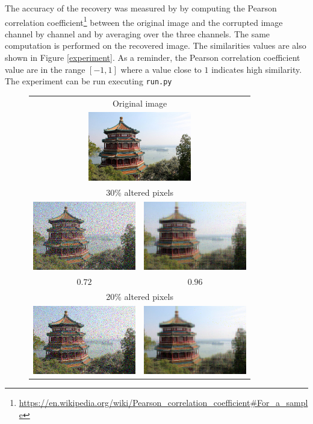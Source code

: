 \documentclass[a4paper]{article}
\begin{document}
The accuracy of the recovery was measured by by computing the Pearson correlation coefficient\footnote{\url{https://en.wikipedia.org/wiki/Pearson_correlation_coefficient#For_a_sample}} between the original image and the corrupted image channel by channel and by averaging over the three channels. The same computation is performed on the recovered image. The similarities values are also shown in Figure \ref{experiment}. As a reminder, the Pearson correlation coefficient value are in the range $[-1, 1]$ where a value close to $1$ indicates high similarity. The experiment can be run executing \texttt{run.py}

\begin{figure}
    \centering
    \begin{tabular}{cc}
        \multicolumn{2}{c}{Original image} \\
        \multicolumn{2}{c}{\includegraphics[width=45mm]{original.png} }\\
        \multicolumn{2}{c}{30\% altered pixels} \\
        \includegraphics[width=45mm]{perturbed-3} & \includegraphics[width=45mm]{restored-3} \\
        $0.72$ & $0.96$ \\
        \multicolumn{2}{c}{20\% altered pixels} \\
        \includegraphics[width=45mm]{perturbed-2} & \includegraphics[width=45mm]{restored-2} \\

\end{tabular}
\end{figure}
\end{document}
